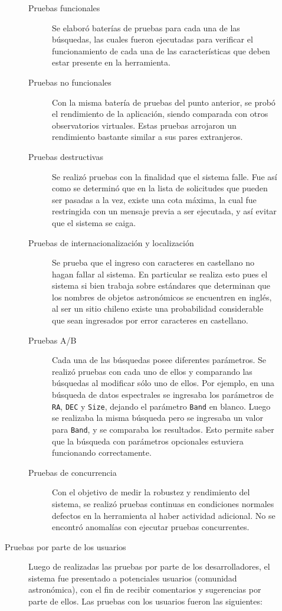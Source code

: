 \begin{description}
\begin{description}
\begin{description}
					\item[Pruebas funcionales] Se elaboró baterías de pruebas para cada una de las búsquedas, las cuales fueron ejecutadas para verificar el funcionamiento de cada una de las características que deben estar presente en la herramienta.
					\item[Pruebas no funcionales] Con la misma batería de pruebas del punto anterior, se probó el rendimiento de la aplicación, siendo comparada con otros observatorios virtuales. Estas pruebas arrojaron un rendimiento bastante similar a sus pares extranjeros.
					\item[Pruebas destructivas] Se realizó pruebas con la finalidad que el sistema falle. Fue así como se determinó que en la lista de solicitudes que pueden ser pasadas a la vez, existe una cota máxima, la cual fue restringida con un mensaje previa a ser ejecutada, y así evitar que el sistema se caiga.
					\item[Pruebas de internacionalización y localización] Se prueba que el ingreso con caracteres en castellano no hagan fallar al sistema. En particular se realiza esto pues el sistema si bien trabaja sobre estándares que determinan que los nombres de objetos astronómicos se encuentren en ingl\'es, al ser un sitio chileno existe una probabilidad considerable que sean ingresados por error caracteres en castellano.
					\item[Pruebas A/B] Cada una de las búsquedas posee diferentes parámetros. Se realizó pruebas con cada uno de ellos y comparando las búsquedas al modificar sólo uno de ellos. Por ejemplo, en una búsqueda de datos espectrales se ingresaba los parámetros de \verb;RA;, \verb;DEC; y \verb;Size;, dejando el parámetro \verb;Band; en blanco. Luego se realizaba la misma búsqueda pero se ingresaba un valor para \verb;Band;, y se comparaba los resultados. Esto permite saber que la búsqueda con parámetros opcionales estuviera funcionando correctamente.
					\item[Pruebas de concurrencia] Con el objetivo de medir la robustez y rendimiento del sistema, se realizó pruebas continuas en condiciones normales defectos en la herramienta al haber actividad adicional. No se encontró anomalías con ejecutar pruebas concurrentes.
				\end{description}
			\item [Pruebas por parte de los usuarios] Luego de realizadas las pruebas por parte de los desarrolladores, el sistema fue presentado a potenciales usuarios (comunidad astronómica), con el fin de recibir comentarios y sugerencias por parte de ellos. Las pruebas con los usuarios fueron las siguientes:

\end{description}
\end{description}
